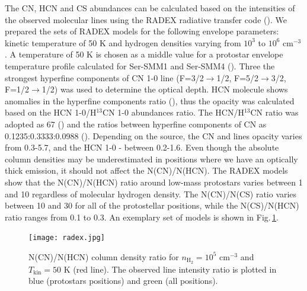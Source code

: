\documentclass[a4paper]{article}
\begin{document}
\indent \indent The CN, HCN and CS abundances can be calculated based on the intensities of the observed molecular lines using the RADEX radiative transfer code (\cite{tak2007}). We prepared the sets of RADEX models for the following envelope parameters: kinetic temperature of 50 K and hydrogen densities varying from $10^3$ to $10^6$ cm$^{-3}$. A temperature of 50 K is chosen as a middle value for a protostar envelope temperature profile calculated for Ser-SMM1 and Ser-SMM4 (\cite{kristensen2010}). Three the strongest hyperfine components of CN 1-0 line (F=3/2$\rightarrow$1/2, F=5/2$\rightarrow$3/2, F=1/2$\rightarrow$1/2) was used to determine the optical depth. HCN molecule shows anomalies in the hyperfine components ratio (\cite{loughnane2012}), thus the opacity was calculated based on the HCN 1-0/H$^{13}$CN 1-0 abundances ratio. The HCN/H$^{13}$CN ratio was adopted as 67 (\cite{yan2019}) and the ratios between hyperfine components of CN as 0.1235:0.3333:0.0988 (\cite{skatrud1983}). Depending on the source, the CN and lines opacity varies from 0.3-5.7, and the HCN 1-0 - between 0.2-1.6. Even though the absolute column densities may be underestimated in positions where we have an optically thick emission, it should not affect the N(CN)/N(HCN). The RADEX models show that the N(CN)/N(HCN) ratio around low-mass protostars varies between 1 and 10 regardless of molecular hydrogen density. The N(CN)/N(CS) ratio varies between 10 and 30 for all of the protostellar positions, while the N(CS)/N(HCN) ratio ranges from 0.1 to 0.3. An exemplary set of models is shown in Fig.\,\ref{fig3}.

\begin{figure}[!h]
\centering
\texttt{[image: radex.jpg]}
\caption{N(CN)/N(HCN) column density ratio for $n_\mathrm{H_2} = 10^5$ cm$^{-3}$ and $T_\mathrm{kin} = 50$ K (red line). The observed line intensity ratio is plotted in blue (protostars positions) and green (all positions).}\label{fig3}
\end{figure}
\end{document}
